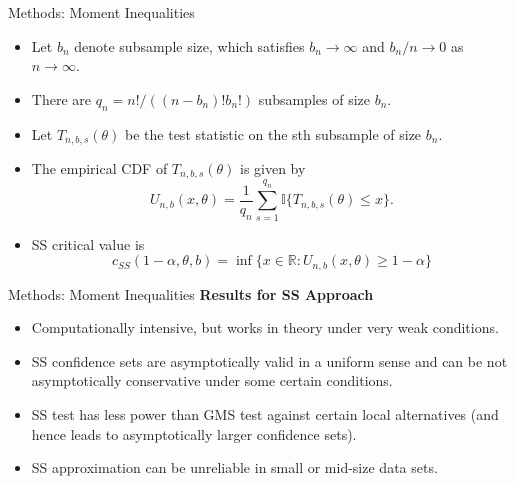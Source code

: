 \documentclass[aspectratio=169]{beamer}  %
\begin{document}
\begin{frame}{Methods: Moment Inequalities}
    
    \begin{itemize}
        \item Let $b_n$ denote subsample size, which satisfies $b_n\to\infty$ and $b_n/n\to0$ as $n\to\infty$.
        \item There are $q_n=n!/((n-b_n)!b_n!)$ subsamples of size $b_n$.
        \item Let $T_{n,b,s}(\theta)$ be the test statistic on the sth subsample of size $b_n$.
        \item The empirical CDF of $T_{n,b,s}(\theta)$ is given by $$U_{n,b}(x,\theta)=\frac{1}{q_n}\sum_{s=1}^{q_n}\mathbb{I}\{T_{n,b,s}(\theta)\leq x\}.$$
        \item SS critical value is
        $$c_{SS}(1-\alpha,\theta,b)=\inf\{x\in\mathbb{R}:U_{n,b}(x,\theta)\geq1-\alpha\}$$
    \end{itemize}
\end{frame}

\begin{frame}{Methods: Moment Inequalities}
    \textbf{Results for SS Approach} 
    \begin{itemize}
        \item Computationally intensive, but works in theory under very weak conditions.
        \item SS confidence sets are asymptotically valid in a uniform sense and can be not asymptotically conservative under some certain conditions.
        \item SS test has less power than GMS test against certain local
        alternatives (and hence leads to asymptotically larger confidence
        sets).
        \item SS approximation can be unreliable in small or mid-size data sets.
    \end{itemize}
\end{frame}
\end{document}
